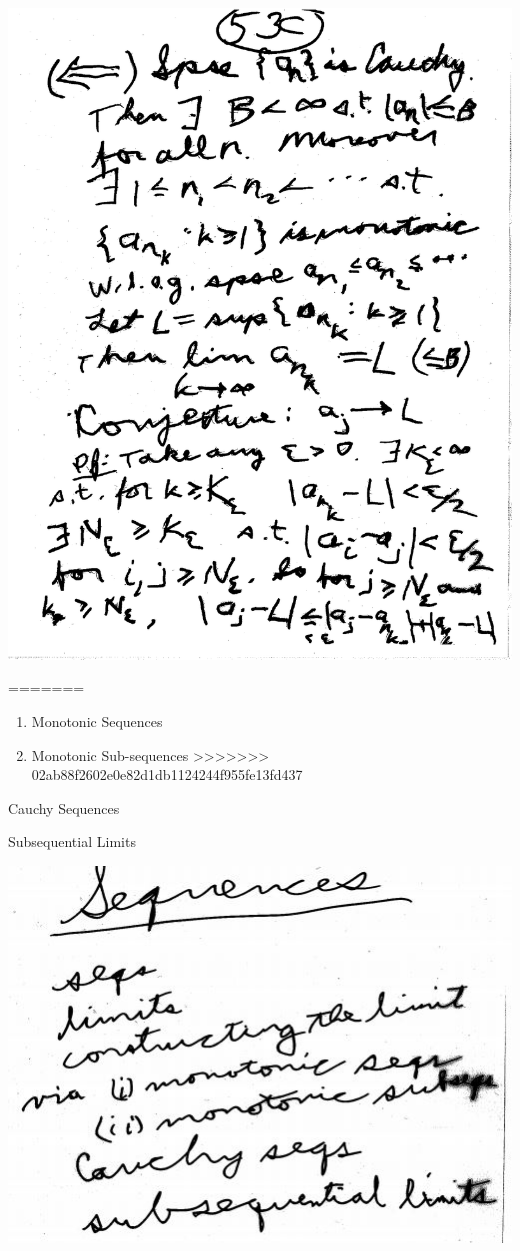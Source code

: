\documentclass[10pt,a4paper]{article}
\begin{document}
{{\includegraphics[scale=.5]{Pages/LC_13}


=======
\begin{enumerate}
\item Monotonic Sequences
\item Monotonic Sub-sequences 
>>>>>>> 02ab88f2602e0e82d1db1124244f955fe13fd437

\end{enumerate}

Cauchy Sequences

Subsequential Limits 

\includegraphics[scale=.8]{Pages/S&L_page1}

}}
\end{document}
